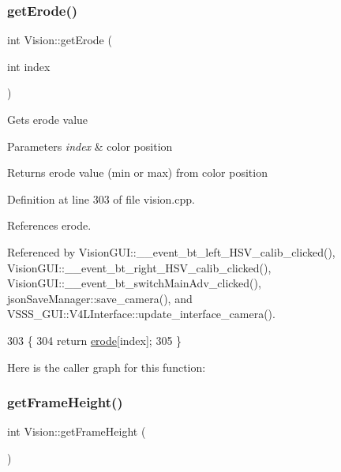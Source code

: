 \subsubsection{\texorpdfstring{get\+Erode()}{getErode()}}
{\footnotesize\ttfamily int Vision\+::get\+Erode (\begin{DoxyParamCaption}\item[{int}]{index }\end{DoxyParamCaption})}

Gets erode value 
\begin{DoxyParams}{Parameters}
{\em index} & color position \\
\hline
\end{DoxyParams}
\begin{DoxyReturn}{Returns}
erode value (min or max) from color position 
\end{DoxyReturn}


Definition at line 303 of file vision.\+cpp.



References erode.



Referenced by Vision\+G\+U\+I\+::\+\_\+\+\_\+event\+\_\+bt\+\_\+left\+\_\+\+H\+S\+V\+\_\+calib\+\_\+clicked(), Vision\+G\+U\+I\+::\+\_\+\+\_\+event\+\_\+bt\+\_\+right\+\_\+\+H\+S\+V\+\_\+calib\+\_\+clicked(), Vision\+G\+U\+I\+::\+\_\+\+\_\+event\+\_\+bt\+\_\+switch\+Main\+Adv\+\_\+clicked(), json\+Save\+Manager\+::save\+\_\+camera(), and V\+S\+S\+S\+\_\+\+G\+U\+I\+::\+V4\+L\+Interface\+::update\+\_\+interface\+\_\+camera().


\begin{DoxyCode}
303                               \{
304     \textcolor{keywordflow}{return} \hyperlink{class_vision_a441302204181d31885b611e10ea92489}{erode}[index];
305 \}
\end{DoxyCode}
Here is the caller graph for this function\+:
\mbox{\label{class_vision_aa24748503769d116bd9d132fcfcc7aea}} 
\subsubsection{\texorpdfstring{get\+Frame\+Height()}{getFrameHeight()}}
{\footnotesize\ttfamily int Vision\+::get\+Frame\+Height (\begin{DoxyParamCaption}{ }\end{DoxyParamCaption})}

